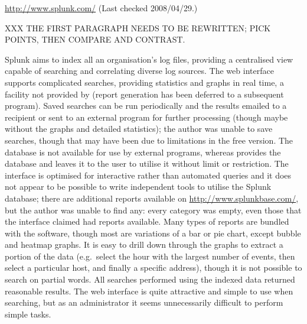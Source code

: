 \noindent{}\url{http://www.splunk.com/} \newline{}
(Last checked 2008/04/29.)

XXX THE FIRST PARAGRAPH NEEDS TO BE REWRITTEN\@; PICK POINTS, THEN COMPARE
AND CONTRAST\@.

Splunk aims to index all an organisation's log files, providing a
centralised view capable of searching and correlating diverse log sources.
The web interface supports complicated searches, providing statistics and
graphs in real time, a facility not provided by \parsername{} (report
generation has been deferred to a subsequent program).  Saved searches can
be run periodically and the results emailed to a recipient or sent to an
external program for further processing (though maybe without the graphs
and detailed statistics); the author was unable to save searches, though
that may have been due to limitations in the free version.  The database is
not available for use by external programs, whereas \parsername{} provides
the database and leaves it to the user to utilise it without limit or
restriction.  The interface is optimised for interactive rather than
automated queries and it does not appear to be possible to write
independent tools to utilise the Splunk database; there are additional
reports available on \url{http://www.splunkbase.com/}, but the author was
unable to find any: every category was empty, even those that the interface
claimed had reports available.  Many types of reports are bundled with the
software, though most are variations of a bar or pie chart, except bubble
and heatmap graphs.  It is easy to drill down through the graphs to extract
a portion of the data (e.g.\ select the hour with the largest number of
events, then select a particular host, and finally a specific address),
though it is not possible to search on partial words.  All searches
performed using the indexed data returned reasonable results.  The web
interface is quite attractive and simple to use when searching, but as an
administrator it seems unnecessarily difficult to perform simple tasks.

